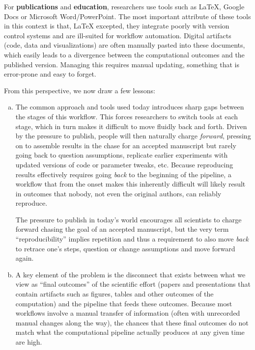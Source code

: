 \documentclass[ChapterTOCs,krantz2]{krantz} %
\theoremstyle{definition}
\begin{document}
For \textbf{publications} and \textbf{education}, researchers use tools such as
\LaTeX, Google Docs or Microsoft Word/PowerPoint.  The most important attribute
of these tools in this context is that, \LaTeX{} excepted, they integrate
poorly with version control systems and are ill-suited for workflow automation.
Digital artifacts (code, data and visualizations) are often manually pasted
into these documents, which easily leads to a divergence between the
computational outcomes and the published version.  Managing this requires
manual updating, something that is error-prone and easy to forget.

From this perspective, we now draw a few lessons:

\begin{enumerate}[(a)]

\item The common approach and tools used today introduces sharp gaps between
  the stages of this workflow.  This forces researchers to switch tools at each
  stage, which in turn makes it difficult to move fluidly back and forth.
  Driven by the pressure to publish, people will then naturally charge
  \emph{forward}, pressing on to assemble results in the chase for an accepted
  manuscript but rarely going back to question assumptions, replicate earlier
  experiments with updated versions of code or parameter tweaks, etc.  Because
  reproducing results effectively requires going \emph{back} to the
  beginning of the pipeline, a workflow that from the onset makes this
  inherently difficult will likely result in outcomes that nobody, not even the
  original authors, can reliably reproduce.

  The pressure to publish in today's world encourages all scientists to charge
  forward chasing the goal of an accepted manuscript, but the very term
  ``reproducibility'' implies repetition and thus a requirement to also move
  \emph{back} to retrace one's steps, question or change assumptions and move
  forward again.

\item A key element of the problem is the disconnect that exists between what
  we view as ``final outcomes'' of the scientific effort (papers and
  presentations that contain artifacts such as figures, tables and other
  outcomes of the computation) and the pipeline that feeds these outcomes.
  Because most workflows involve a manual transfer of information (often with
  unrecorded manual changes along the way), the chances that these final
  outcomes do not match what the computational pipeline actually produces at any
  given time are high.


\end{enumerate}
\end{document}
